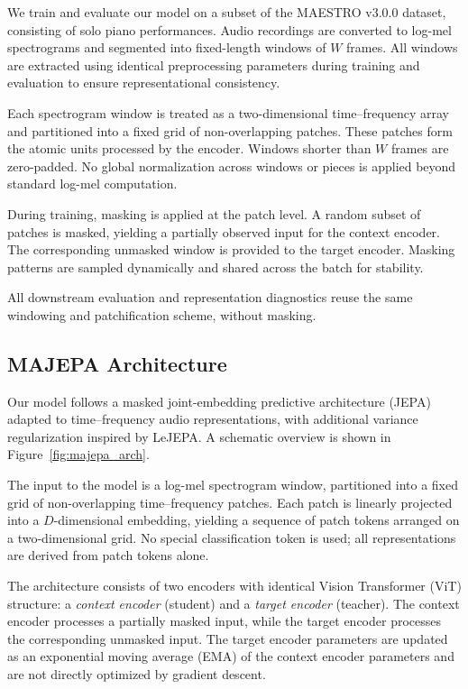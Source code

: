 \documentclass[10pt,twocolumn]{article}
\begin{document}
We train and evaluate our model on a subset of the MAESTRO v3.0.0 dataset, consisting of solo piano performances. Audio recordings are converted to log-mel spectrograms and segmented into fixed-length windows of $W$ frames. All windows are extracted using identical preprocessing parameters during training and evaluation to ensure representational consistency.

Each spectrogram window is treated as a two-dimensional time--frequency array and partitioned into a fixed grid of non-overlapping patches. These patches form the atomic units processed by the encoder. Windows shorter than $W$ frames are zero-padded. No global normalization across windows or pieces is applied beyond standard log-mel computation.

During training, masking is applied at the patch level. A random subset of patches is masked, yielding a partially observed input for the context encoder. The corresponding unmasked window is provided to the target encoder. Masking patterns are sampled dynamically and shared across the batch for stability.

All downstream evaluation and representation diagnostics reuse the same windowing and patchification scheme, without masking.

\subsection{MAJEPA Architecture}
\label{sec:architecture}

Our model follows a masked joint-embedding predictive architecture (JEPA) adapted to time--frequency audio representations, with additional variance regularization inspired by LeJEPA. A schematic overview is shown in Figure~\ref{fig:majepa_arch}.

The input to the model is a log-mel spectrogram window, partitioned into a fixed grid of non-overlapping time--frequency patches. Each patch is linearly projected into a $D$-dimensional embedding, yielding a sequence of patch tokens arranged on a two-dimensional grid. No special classification token is used; all representations are derived from patch tokens alone.

The architecture consists of two encoders with identical Vision Transformer (ViT) structure: a \emph{context encoder} (student) and a \emph{target encoder} (teacher). The context encoder processes a partially masked input, while the target encoder processes the corresponding unmasked input. The target encoder parameters are updated as an exponential moving average (EMA) of the context encoder parameters and are not directly optimized by gradient descent.
\end{document}
